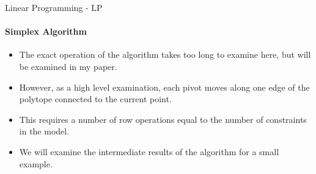 \documentclass{beamer}
\begin{document}
	\begin{frame}{Linear Programming - LP}
		\framesubtitle{Simplex Algorithm}
		\begin{itemize}
			\item The exact operation of the algorithm takes too long to examine here, but will be examined in my paper.
			\item However, as a high level examination, each pivot moves along one edge of the polytope connected to the current point.
			\item This requires a number of row operations equal to the number of constraints in the model.
			\item We will examine the intermediate results of the algorithm for a small example.
		\end{itemize}
	\end{frame}
\end{document}
